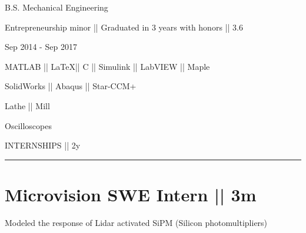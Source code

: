 \documentclass[letterpaper,10pt,oneside]{article}
\begin{document}
\begin{body}
{{\small B.S. Mechanical Engineering}}
\begin{detail}
\BulletItem
Entrepreneurship minor || Graduated in 3 years with honors || 3.6
\end{detail}

\begin{subtitle}
\vspace{-8ex}
{{Sep 2014 - Sep 2017}}
\end{subtitle}
\vspace{1ex}

\vspace{-1ex}


\vspace{-1.5ex}
{
\vspace{1.8ex}
\color{cyan}\small
{MATLAB || \LaTeX || C || Simulink || LabVIEW || Maple} %
}

{
\vspace{-2.5ex}\hspace{3.17in}
\color{cyan}\small
{SolidWorks || Abaqus || Star-CCM+} %
}

{
\vspace{-0.5ex}
\color{cyan}\small
{Lathe || Mill} %
}

{
\vspace{-2.5ex}\hspace{3.17in}
\color{cyan}\small
{Oscilloscopes} %
}




{
\hspace{-1.72in}\noindent\color{cblue}
{INTERNSHIPS  } 
{\small \color{black} || 2y}
}

\vspace{-1.6ex}
{\hspace{-1.73in}\noindent\color{dblue}\rule{6.935in}{0.4pt}} %
\vspace{-5ex}


\section
{\textbf{Microvision}
\newline
SWE Intern || 3m
\newline}


\vspace{-2.5ex}
\begin{detail}
\BulletItem
Modeled the response of Lidar activated SiPM (Silicon photomultipliers) 
\end{detail}


\end{body}
\end{document}
